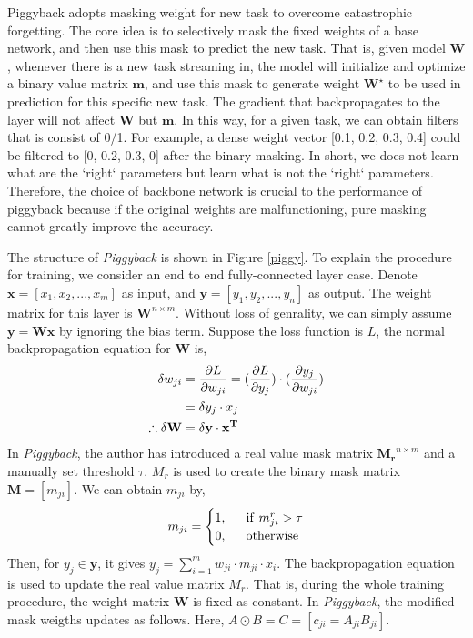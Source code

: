 Piggyback adopts masking weight for new task to overcome catastrophic forgetting. The core idea is to selectively mask the fixed weights of a base network, and then use this mask to predict the new task. That is, given model $\mathbf{W}$, whenever there is a new task streaming in, the model will initialize and optimize a binary value matrix $\mathbf{m}$, and use this mask to generate weight $\mathbf{W^\star}$ to be used in prediction for this specific new task. The gradient that backpropagates to the layer will not affect $\mathbf{W}$ but $\mathbf{m}$. In this way, for a given task, we can obtain filters that is consist of 0/1. For example, a dense weight vector [0.1, 0.2, 0.3, 0.4] could be filtered to [0, 0.2, 0.3, 0] after the binary masking. In short, we does not learn what are the `right` parameters but learn what is not the `right` parameters. Therefore, the choice of backbone network is crucial to the performance of piggyback because if the original weights are malfunctioning, pure masking cannot greatly improve the accuracy.

The structure of \textit{Piggyback} is shown in Figure \ref{piggy}. To explain the procedure for training, we consider an end to end fully-connected layer case. Denote $\mathbf{x}=[x_1, x_2, ..., x_m]$ as input, and $\mathbf{y}=[y_1, y_2, ..., y_n]$ as output. The weight matrix for this layer is $\mathbf{W}^{n\times m}$. Without loss of genrality, we can simply assume $\mathbf{y}=\mathbf{W}\mathbf{x}$ by ignoring the bias term. Suppose the loss function is $L$, the normal backpropagation equation for $\mathbf{W}$ is,
\begin{equation}
\centering
\begin{aligned}
\delta w_{ji}&=\frac{\partial L}{\partial w_{ji}} = (\frac{\partial L}{\partial y_j})\cdot (\frac{\partial y_j}{\partial w_{ji}}) \\
&= \delta y_j \cdot x_j \\
\therefore \delta \mathbf{W} &= \delta \mathbf{y} \cdot  \mathbf{x^T} \\
\end{aligned}
\end{equation}
In \textit{Piggyback}, the author has introduced a real value mask matrix $\mathbf{M_r}^{n\times m}$ and a manually set threshold $\tau$. $M_r$ is used to create the binary mask matrix $\mathbf{M}=[m_{ji}]$. We can obtain $m_{ji}$ by,
\begin{equation}
m_{ji}=\begin{cases}
1,\ \ &{\rm if}\ m^r_{ji}>\tau \\
0,\ \ &{\rm otherwise} \\
\end{cases}
\end{equation}
Then, for $y_j\in\mathbf{y}$, it gives $y_j=\sum_{i=1}^m w_{ji}\cdot m_{ji} \cdot x_i$. The backpropagation equation is used to update the real value matrix $M_r$. That is, during the whole training procedure, the weight matrix $\mathbf{W}$ is fixed as constant. In \textit{Piggyback}, the modified mask weigths updates as follows. Here, $A\odot B = C=[c_{ji}=A_{ji}B_{ji}]$. 

